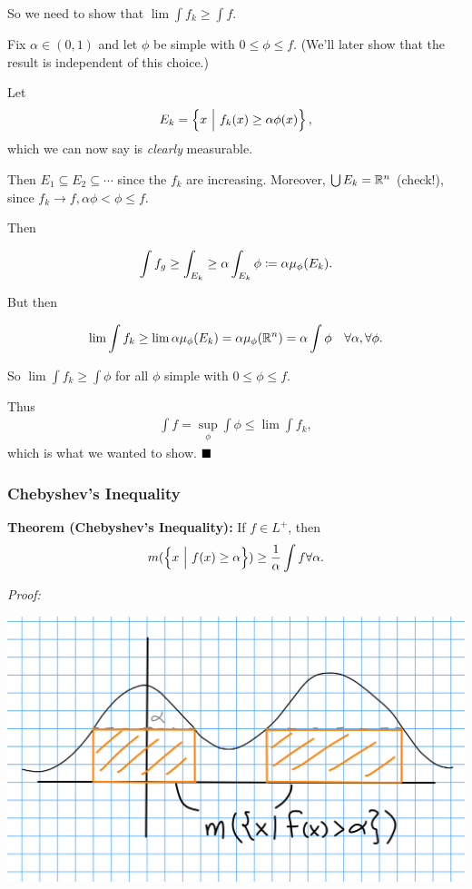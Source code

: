 So we need to show that \(\lim \int f_k \geq \int f\).

Fix \(\alpha \in (0, 1)\) and let \(\phi\) be simple with
\(0 \leq \phi \leq f\). (We'll later show that the result is independent
of this choice.)

Let
\begin{align*}
E_k = \left\{{x {~\mathrel{\Big|}~} f_k(x) \geq \alpha \phi(x)}\right\}
,\end{align*} which we can now say is \emph{clearly} measurable.

Then \(E_1 \subseteq E_2 \subseteq \cdots\) since the \(f_k\) are
increasing. Moreover, \(\bigcup E_k = {\mathbb{R}}^n\) (check!), since
\(f_k \to f, \alpha \phi < \phi \leq f\).

Then

\begin{align*}
\int f_g \geq \int_{E_k} 
\geq \alpha \int_{E_k}\phi 
\coloneqq \alpha \mu_\phi(E_k)
.\end{align*}

But then

\begin{align*}
\lim \int f_k \geq \lim \alpha \mu_\phi(E_k) = \alpha \mu_\phi({\mathbb{R}}^n) = \alpha \int \phi
\quad \forall \alpha, \forall \phi
.\end{align*}

So \(\lim \int f_k \geq \int \phi\) for all \(\phi\) simple with
\(0\leq \phi \leq f\).

Thus
\begin{align*}
\int f = \sup_\phi \int \phi \leq \lim \int f_k
,\end{align*} which is what we wanted to show. \(\qed\)

\hypertarget{chebyshevs-inequality}{%
\subsubsection{Chebyshev's Inequality}\label{chebyshevs-inequality}}

\textbf{Theorem (Chebyshev's Inequality):} If \(f\in L^+\), then
\begin{align*}m(\left\{{x {~\mathrel{\Big|}~} f(x) \geq \alpha}\right\}) \geq \frac 1 \alpha \int f \forall \alpha
.\end{align*}

\emph{Proof:}

\includegraphics{figures/2019-09-19-11:46.png}\\

